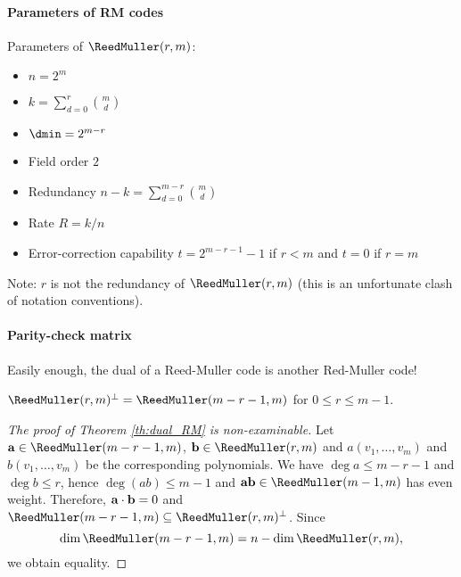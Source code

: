 \documentclass[a4paper, 11pt, openany]{book}
\begin{document}

%


\paragraph{Parameters of RM codes}
Parameters of $\ReedMuller(r,m)$:
\begin{itemize}
	\item {} $n = 2^m$
	\item {} $k = \sum_{d=0}^r \binom{m}{d}$
	\item {} $\dmin = 2^{m-r}$
    \item Field order $2$
	\item Redundancy $n-k = \sum_{d=0}^{m-r} \binom{m}{d}$
	\item Rate $R = k/n$
	\item Error-correction capability $t = 2^{m-r-1} - 1$ if $r < m$ and $t=0$ if $r=m$
\end{itemize}
Note: $r$ is not the redundancy of $\ReedMuller(r,m)$ (this is an unfortunate clash of notation conventions).



\paragraph{Parity-check matrix} Easily enough, the dual of a Reed-Muller code is another Red-Muller code!


\begin{theorem}  \label{th:dual_RM}
$\ReedMuller(r,m)^\perp = \ReedMuller(m-r-1,m)$ for $0 \le r \le m-1$.
\end{theorem}

\begin{proof}[The proof of Theorem \ref{th:dual_RM} is non-examinable]
Let ${\bf a} \in \ReedMuller(m-r-1,m)$, ${\bf b} \in \ReedMuller(r,m)$ and $a(v_1, \dots, v_m)$ and $b(v_1, \dots, v_m)$ be the corresponding polynomials.
We have $\deg a \le m-r-1$ and $\deg b \le r$, hence $\deg (ab) \le m-1$ and ${\bf ab} \in \ReedMuller(m-1,m)$ has even weight. Therefore, ${\bf a} \cdot {\bf b} = 0$ and $\ReedMuller(m-r-1,m) \subseteq \ReedMuller(r,m)^\perp$. Since
\[
	\dim \ReedMuller(m-r-1,m) = n - \dim \ReedMuller(r,m),
\]
we obtain equality.
\end{proof}
\end{document}
